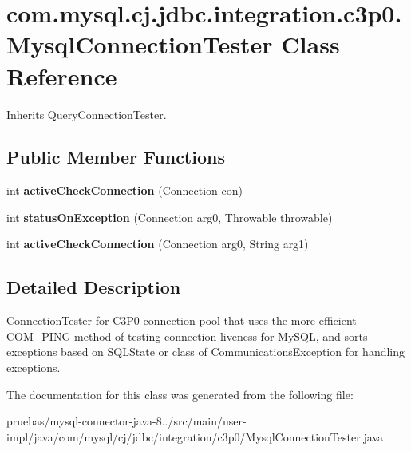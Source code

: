 \hypertarget{classcom_1_1mysql_1_1cj_1_1jdbc_1_1integration_1_1c3p0_1_1_mysql_connection_tester}{}\section{com.\+mysql.\+cj.\+jdbc.\+integration.\+c3p0.\+Mysql\+Connection\+Tester Class Reference}
\label{classcom_1_1mysql_1_1cj_1_1jdbc_1_1integration_1_1c3p0_1_1_mysql_connection_tester}


Inherits Query\+Connection\+Tester.

\subsection*{Public Member Functions}
\begin{DoxyCompactItemize}
\item 
\mbox{\label{classcom_1_1mysql_1_1cj_1_1jdbc_1_1integration_1_1c3p0_1_1_mysql_connection_tester_a4a57e4d2b76208bb22e8effb5afe7fbf}} 
int {\bfseries active\+Check\+Connection} (Connection con)
\item 
\mbox{\label{classcom_1_1mysql_1_1cj_1_1jdbc_1_1integration_1_1c3p0_1_1_mysql_connection_tester_ab625c55dddeb0306fe2c65b950c57f00}} 
int {\bfseries status\+On\+Exception} (Connection arg0, Throwable throwable)
\item 
\mbox{\label{classcom_1_1mysql_1_1cj_1_1jdbc_1_1integration_1_1c3p0_1_1_mysql_connection_tester_a7e38707b36013ff97888f67dbac7b9d1}} 
int {\bfseries active\+Check\+Connection} (Connection arg0, String arg1)
\end{DoxyCompactItemize}


\subsection{Detailed Description}
Connection\+Tester for C3\+P0 connection pool that uses the more efficient C\+O\+M\+\_\+\+P\+I\+NG method of testing connection \textquotesingle{}liveness\textquotesingle{} for My\+S\+QL, and \textquotesingle{}sorts\textquotesingle{} exceptions based on S\+Q\+L\+State or class of \textquotesingle{}Communications\+Exception\textquotesingle{} for handling exceptions. 

The documentation for this class was generated from the following file\+:\begin{DoxyCompactItemize}
\item 
pruebas/mysql-\/connector-\/java-\/8../src/main/user-\/impl/java/com/mysql/cj/jdbc/integration/c3p0/Mysql\+Connection\+Tester.\+java\end{DoxyCompactItemize}
